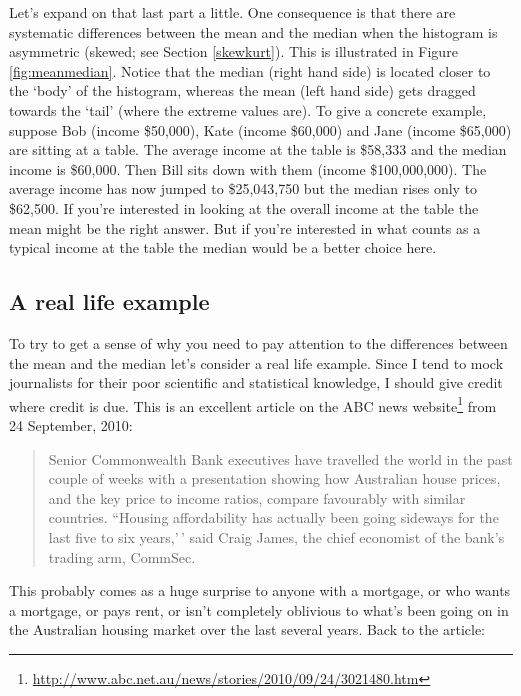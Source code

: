 \documentclass[
]{book}
\begin{document}
Let's expand on that last part a little. One consequence is that there are systematic differences between the mean and the median when the histogram is asymmetric (skewed; see Section \ref{skewkurt}). This is illustrated in Figure \ref{fig:meanmedian}. Notice that the median (right hand side) is located closer to the `body' of the histogram, whereas the mean (left hand side) gets dragged towards the `tail' (where the extreme values are). To give a concrete example, suppose Bob (income \$50,000), Kate (income \$60,000) and Jane (income \$65,000) are sitting at a table. The average income at the table is \$58,333 and the median income is \$60,000. Then Bill sits down with them (income \$100,000,000). The average income has now jumped to \$25,043,750 but the median rises only to \$62,500. If you're interested in looking at the overall income at the table the mean might be the right answer. But if you're interested in what counts as a typical income at the table the median would be a better choice here.

\hypertarget{housingpriceexample}{%
\subsection{A real life example}\label{housingpriceexample}}

To try to get a sense of why you need to pay attention to the differences between the mean and the median let's consider a real life example. Since I tend to mock journalists for their poor scientific and statistical knowledge, I should give credit where credit is due. This is an excellent article on the ABC news website\footnote{\url{http://www.abc.net.au/news/stories/2010/09/24/3021480.htm}} from 24 September, 2010:

\begin{quote}
Senior Commonwealth Bank executives have travelled the world in the past couple of weeks with a presentation showing how Australian house prices, and the key price to income ratios, compare favourably with similar countries. ``Housing affordability has actually been going sideways for the last five to six years,'\,' said Craig James, the chief economist of the bank's trading arm, CommSec.
\end{quote}

This probably comes as a huge surprise to anyone with a mortgage, or who wants a mortgage, or pays rent, or isn't completely oblivious to what's been going on in the Australian housing market over the last several years. Back to the article:
\end{document}

